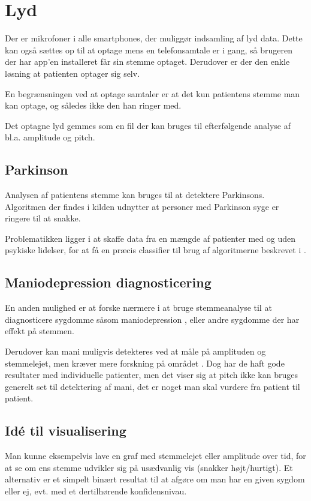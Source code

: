 \section{Lyd}
Der er mikrofoner i alle smartphones, der muliggør indsamling af lyd data.
Dette kan også sættes op til at optage mens en telefonsamtale er i gang, så brugeren der har app'en installeret får sin stemme optaget.
Derudover er der den enkle løsning at patienten optager sig selv.

En begrænsningen ved at optage samtaler er at det kun patientens stemme man kan optage, og således ikke den han ringer med.

Det optagne lyd gemmes som en fil der kan bruges til efterfølgende analyse af bl.a. amplitude og pitch.

\subsection{Parkinson}
Analysen af patientens stemme kan bruges til at detektere Parkinsons\citep{6168572}.
Algoritmen der findes i kilden udnytter at personer med Parkinson syge er ringere til at snakke.

Problematikken ligger i at skaffe data fra en mængde af patienter med og uden psykiske lidelser, for at få en præcis classifier til brug af algoritmerne beskrevet i \citep{6168572,6346375}.

\subsection{Maniodepression diagnosticering}
En anden mulighed er at forske nærmere i at bruge stemmeanalyse til at diagnosticere sygdomme såsom maniodepression \citep{6346375}, eller andre sygdomme der har effekt på stemmen.

Derudover kan mani muligvis detekteres ved at måle på amplituden og stemmelejet, men kræver mere forskning på området \citep{6346375}.
Dog har de haft gode resultater med individuelle patienter, men det viser sig at pitch ikke kan bruges generelt set til detektering af mani, det er noget man skal vurdere fra patient til patient.
	
\subsection{Idé til visualisering}
Man kunne eksempelvis lave en graf med stemmelejet eller amplitude over tid, for at se om ens stemme udvikler sig på usædvanlig vis (snakker højt/hurtigt).
Et alternativ er et simpelt binært resultat til at afgøre om man har en given sygdom eller ej, evt. med et dertilhørende konfidensnivau.

